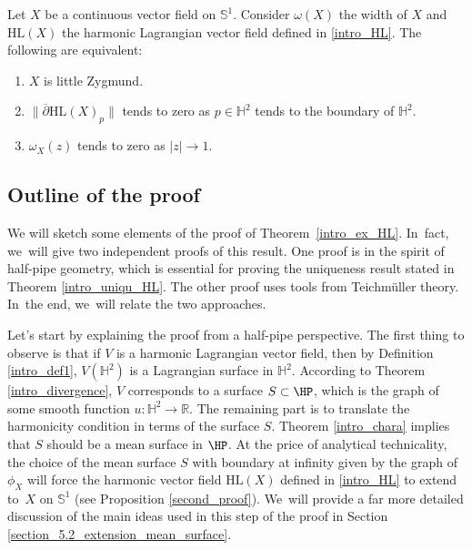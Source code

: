 \begin{theorem}\label{Intro_chara_little}
Let $X$ be a continuous vector field on $\mathbb{S}^1$. Consider $\omega(X)$ the width of $X$ and $\mathrm{HL}(X)$ the harmonic Lagrangian vector field defined in \eqref{intro_HL}. The following are equivalent:
\begin{enumerate}
\item $X$ is little Zygmund.
\item $\lVert \overline{\partial} \mathrm{HL}(X)_p\rVert$ tends to zero as $p \in \mathbb{H}^2$ tends to the boundary of $\mathbb{H}^2$.
\item $\omega_X(z)$ tends to zero as $\lvert z \rvert \to 1$.
\end{enumerate}
\end{theorem}

\subsection{Outline of the proof}\label{outline_of_the_proof}

We will sketch some elements of the proof of Theorem~\ref{intro_ex_HL}. In~fact, we~will give two independent proofs of this result. One proof is in the spirit of half-pipe geometry, which is essential for proving the uniqueness result stated in Theorem \ref{intro_uniqu_HL}. The other proof uses tools from Teichmüller theory. In~the end, we~will relate the two approaches.

Let's start by explaining the proof from a half-pipe perspective. The first thing to observe is that if \(V \) is a harmonic Lagrangian vector field, then by Definition \ref{intro_def1}, \(V(\mathbb{H}^2) \) is a Lagrangian surface in \(\mathbb{H}^2 \). According to Theorem \ref{intro_divergence}, \(V \) corresponds to a surface \(S \subset \HP \), which is the graph of some smooth function \(u: \mathbb{H}^2 \to \mathbb{R} \). The remaining part is to translate the harmonicity condition in terms of the surface \(S \). Theorem \ref{intro_chara} implies that \(S \) should be a mean surface in \(\HP\). At the price of analytical technicality, the choice of the mean surface \(S \) with boundary at infinity given by the graph of \(\phi_X \) will force the harmonic vector field \(\mathrm{HL}(X)\) defined in \eqref{intro_HL} to extend to~\(X \) on \(\mathbb{S}^1\) (see Proposition \ref{second_proof}). We~will provide a far more detailed discussion of the main ideas used in this step of the proof in Section \ref{section_5.2_extension_mean_surface}.

